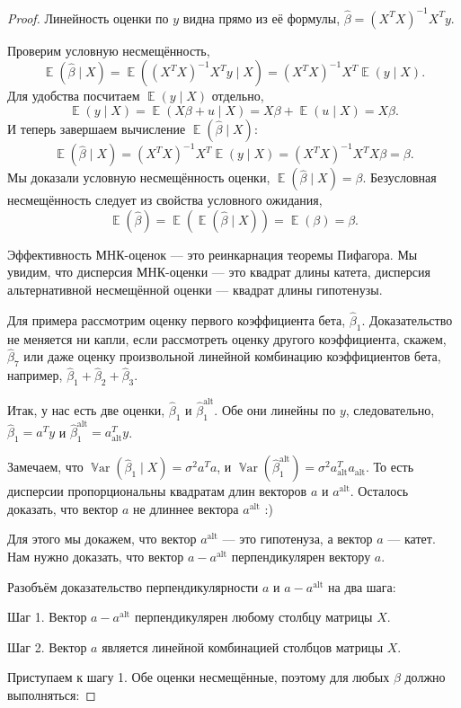 \documentclass[12pt]{article}
\DeclareMathOperator{\Var}{\mathbb{V}ar}
\DeclareMathOperator{\E}{\mathbb{E}}
\newcommand{\hb}{\hat{\beta}}
\newcommand{\alt}{\text{alt}}
\begin{document}
\begin{proof}
Линейность оценки по $y$ видна прямо из её формулы, $\hb = (X^TX)^{-1}X^Ty$.

Проверим условную несмещённость, 
\[
\E(\hb \mid X) = \E((X^TX)^{-1}X^Ty \mid X) = (X^TX)^{-1}X^T\E(y \mid X).
\]
Для удобства посчитаем $\E(y \mid X)$ отдельно,
\[
\E(y \mid X) = \E(X\beta + u \mid X) = X\beta + \E(u \mid X) = X\beta.
\]
И теперь завершаем вычисление $\E(\hb \mid X)$:
\[
\E(\hb \mid X) = (X^TX)^{-1}X^T\E(y \mid X) = (X^TX)^{-1}X^TX\beta = \beta.
\]
Мы доказали условную несмещённость оценки, $\E(\hb \mid X) = \beta$.
Безусловная несмещённость следует из свойства условного ожидания,
\[
\E(\hb) = \E(\E(\hb \mid X)) = \E(\beta) = \beta.
\]

Эффективность МНК-оценок — это реинкарнация теоремы Пифагора. 
Мы увидим, что дисперсия МНК-оценки — это квадрат длины катета, 
дисперсия альтернативной несмещённой оценки — квадрат длины гипотенузы.

Для примера рассмотрим оценку первого коэффициента бета, $\hb_1$.
Доказательство не меняется ни капли, если рассмотреть оценку другого коэффициента, скажем, $\hb_7$ или даже оценку произвольной линейной комбинацию коэффициентов бета, например, $\hb_1 + \hb_2 + \hb_3$.

Итак, у нас есть две оценки, $\hb_1$ и $\hb_1^{\alt}$. 
Обе они линейны по $y$, следовательно, $\hb_1 = a^T y$ и $\hb_1^{\alt} = a^T_{\alt} y$.


Замечаем, что $\Var(\hb_1 \mid X) = \sigma^2 a^Ta$, и $\Var(\hb_1^{\alt}) = \sigma^2 a_{\alt}^Ta_{\alt}$. 
То есть дисперсии пропорциональны квадратам длин векторов $a$ и $a^{\alt}$. 
Осталось доказать, что вектор $a$ не длиннее вектора $a^{\alt}$ :)

Для этого мы докажем, что вектор $a^{\alt}$ — это гипотенуза, а вектор $a$ — катет. 
Нам нужно доказать, что вектор $a - a^{\alt}$ перпендикулярен вектору $a$.

Разобъём доказательство перпендикулярности $a$ и $a-a^{\alt}$ на два шага:

Шаг 1. Вектор $a - a^{\alt}$ перпендикулярен любому столбцу матрицы $X$.

Шаг 2. Вектор $a$ является линейной комбинацией столбцов матрицы $X$.






Приступаем к шагу 1. Обе оценки несмещённые, поэтому для любых $\beta$ должно выполняться:


\end{proof}
\end{document}
